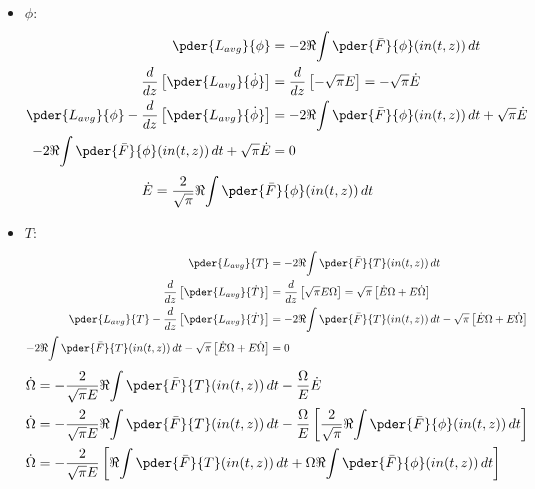 \begin{itemize}
\item $\phi$:
\begin{equation}
\begin{split}
\pder{L_{avg}}{\phi} &=- 2\Re{\int \pder{\bar{F}}{\phi} (in(t,z))\,dt}\\
\frac{d}{dz}\left[\pder{L_{avg}}{\dot{\phi}}\right] &= \frac{d}{dz}\left[-\sqrt{\pi} E \right] = -\sqrt{\pi} \dot{E} \\
 \pder{L_{avg}}{\phi} - \frac{d}{dz}\left[\pder{L_{avg}}{\dot{\phi}}\right] &=  - 2\Re{\int \pder{\bar{F}}{\phi} (in(t,z))\,dt} + \sqrt{\pi} \dot{E}\\
- 2\Re{\int \pder{\bar{F}}{\phi} (in(t,z))\,dt} + \sqrt{\pi} \dot{E} &= 0\\
\end{split}
\end{equation}
\begin{equation}
\begin{split}
\dot{E} &=  \frac{2}{\sqrt{\pi}}\Re{\int \pder{\bar{F}}{\phi} (in(t,z))\,dt}
\end{split}
\end{equation}



\item $T$:
\begin{equation}
\begin{split}
\pder{L_{avg}}{T} &= - 2\Re{\int \pder{\bar{F}}{T} (in(t,z))\,dt}\\
\frac{d}{dz}\left[\pder{L_{avg}}{\dot{T}}\right] &= \frac{d}{dz}\left[ \sqrt{\pi} E \Omega\right] =  \sqrt{\pi} \left[\dot{E}\Omega + E\dot{\Omega}\right] \\
\pder{L_{avg}}{T} - \frac{d}{dz}\left[\pder{L_{avg}}{\dot{T}}\right] &= - 2\Re{\int \pder{\bar{F}}{T} (in(t,z))\,dt}- \sqrt{\pi} \left[\dot{E}\Omega + E\dot{\Omega}\right]\\
- 2\Re{\int \pder{\bar{F}}{T} (in(t,z))\,dt}- \sqrt{\pi} \left[\dot{E}\Omega + E\dot{\Omega}\right] &= 0 \\
\end{split}
\end{equation}
\begin{equation}
\begin{split}
 \dot{\Omega} & =  - \frac{2}{\sqrt{\pi}E }\Re{\int \pder{\bar{F}}{T} (in(t,z))\,dt} - \frac{\Omega}{E} \dot{E}  \\
 \dot{\Omega} & =  - \frac{2}{\sqrt{\pi}E }\Re{\int \pder{\bar{F}}{T} (in(t,z))\,dt} - \frac{\Omega}{E} \left[ \frac{2}{\sqrt{\pi}}\Re{\int \pder{\bar{F}}{\phi} (in(t,z))\,dt}\right] \\
 \dot{\Omega} & =  - \frac{2}{\sqrt{\pi}E }\left[\Re{\int \pder{\bar{F}}{T} (in(t,z))\,dt}  + \Omega\Re{\int \pder{\bar{F}}{\phi} (in(t,z))\,dt}\right] \\
\end{split}
\end{equation}


\end{itemize}
